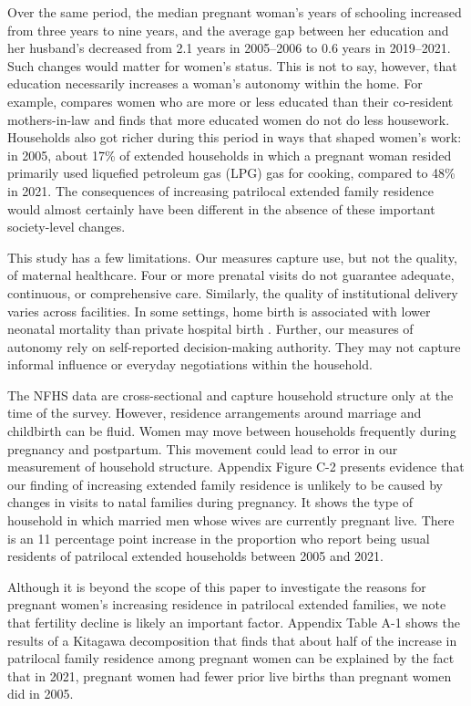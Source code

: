 \documentclass[12pt]{article}
\begin{document}
Over the same period, the median pregnant woman's years of schooling increased from three years to nine years, and the average gap between her education and her husband's decreased from 2.1 years in 2005--2006 to 0.6 years in 2019--2021.  Such changes would matter for women's status.  This is not to say, however, that education necessarily increases a woman's autonomy within the home.  For example, \cite{srivastava2020time} compares women who are more or less educated than their co-resident mothers-in-law and finds that more educated women do not do less housework.  Households also got richer during this period in ways that shaped women's work: in 2005, about 17\% of extended households in which a pregnant woman resided primarily used liquefied petroleum gas (LPG) gas  for cooking, compared to 48\% in 2021.  The consequences of increasing patrilocal extended family residence would almost certainly have been different in the absence of these important society-level changes.

This study has a few limitations. Our measures capture use, but not the quality, of maternal healthcare. Four or more prenatal visits do not guarantee adequate, continuous, or comprehensive care. Similarly, the quality of institutional delivery varies across facilities.  In some settings, home birth is associated with lower neonatal mortality than private hospital birth \citep{coffey2025excess}. Further, our measures of autonomy rely on self-reported decision-making authority. They may not capture informal influence or everyday negotiations within the household. 

The NFHS data are cross-sectional and capture household structure only at the time of the survey. However, residence arrangements around marriage and childbirth can be fluid. Women may move between households frequently during pregnancy and postpartum. This movement could lead to error in our measurement of household structure.  Appendix Figure C-2 presents evidence that our finding of increasing extended family residence is unlikely to be caused by changes in visits to natal families during pregnancy.  It shows the type of household in which married men whose wives are currently pregnant live.  There is an 11 percentage point increase in the proportion who report being usual residents of patrilocal extended households between 2005 and 2021.

Although it is beyond the scope of this paper to investigate the reasons for pregnant women's increasing residence in patrilocal extended families, we note that fertility decline is likely an important factor.  Appendix Table A-1 shows the results of a Kitagawa decomposition that finds that about half of the increase in patrilocal family residence among pregnant women can be explained by the fact that in 2021, pregnant women had fewer prior live births than pregnant women did in 2005.  
\end{document}
